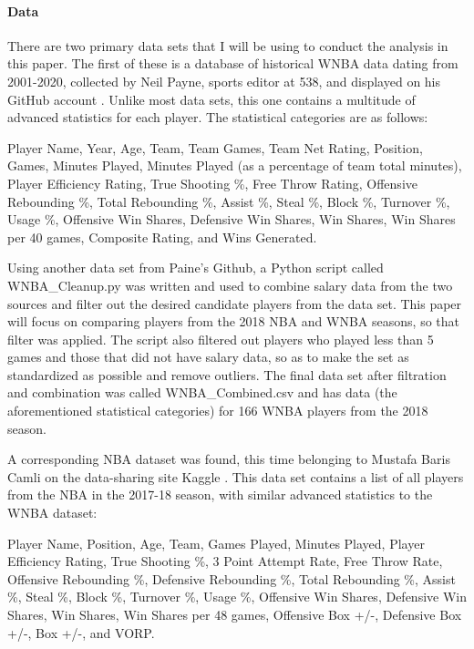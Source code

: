 \documentclass[12pt]{article}
\begin{document}
\paragraph{Data}
There are two primary data sets that I will be using to conduct the analysis in this paper. The first of these is a database of historical WNBA data dating from 2001-2020, collected by Neil Payne, sports editor at 538, and displayed on his GitHub account \cite{first}. Unlike most data sets, this one contains a multitude of advanced statistics for each player. The statistical categories are as follows:
\newline
\par
Player Name, Year, Age, Team, Team Games, Team Net Rating, Position, Games, Minutes Played, Minutes Played (as a percentage of team total minutes), Player Efficiency Rating, True Shooting \%, Free Throw Rating, Offensive Rebounding \%, Total Rebounding \%, Assist \%, Steal \%, Block \%, Turnover \%, Usage \%, Offensive Win Shares, Defensive Win Shares, Win Shares, Win Shares per 40 games, Composite Rating, and Wins Generated.
\newline
\par
Using another data set from Paine’s Github, a Python script called WNBA\_Cleanup.py was written and used to combine salary data from the two sources and filter out the desired candidate players from the data set. This paper will focus on comparing players from the 2018 NBA and WNBA seasons, so that filter was applied. The script also filtered out players who played less than 5 games and those that did not have salary data, so as to make the set as standardized as possible and remove outliers. The final data set after filtration and combination was called WNBA\_Combined.csv and has data (the aforementioned statistical categories) for 166 WNBA players from the 2018 season.
\par
A corresponding NBA dataset was found, this time belonging to Mustafa Baris Camli on the data-sharing site Kaggle \cite{nba}. This data set contains a list of all players from the NBA in the 2017-18 season, with similar advanced statistics to the WNBA dataset:
\newline
\par
Player Name, Position, Age, Team, Games Played, Minutes Played, Player Efficiency Rating, True Shooting \%, 3 Point Attempt Rate, Free Throw Rate, Offensive Rebounding \%, Defensive Rebounding \%, Total Rebounding \%, Assist \%, Steal \%, Block \%, Turnover \%, Usage \%, Offensive Win Shares, Defensive Win Shares, Win Shares, Win Shares per 48 games, Offensive Box +/-, Defensive Box +/-, Box +/-, and VORP.
\end{document}
